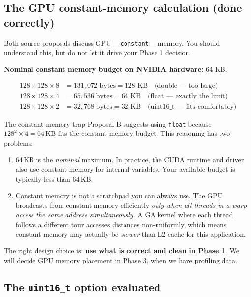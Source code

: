 \documentclass[11pt]{article}
\begin{document}
\subsection{The GPU constant-memory calculation (done correctly)}

Both source proposals discuss GPU \texttt{\_\_constant\_\_} memory. You should understand this, but do not let it drive your Phase 1 decision.

\textbf{Nominal constant memory budget on NVIDIA hardware:} 64 KB.

\begin{align*}
128 \times 128 \times 8 &= 131{,}072 \text{ bytes} = 128 \text{ KB} \quad \text{(double --- too large)} \\
128 \times 128 \times 4 &= 65{,}536 \text{ bytes} = 64 \text{ KB} \quad \text{(float --- exactly the limit)} \\
128 \times 128 \times 2 &= 32{,}768 \text{ bytes} = 32 \text{ KB} \quad \text{(uint16\_t --- fits comfortably)}
\end{align*}

\begin{warning}{The constant-memory trap}
Proposal B suggests using \texttt{float} because $128^2 \times 4 = 64$\,KB fits the constant memory budget. This reasoning has two problems:

\begin{enumerate}[label=\arabic*.]
  \item 64\,KB is the \emph{nominal} maximum. In practice, the CUDA runtime and driver also use constant memory for internal variables. Your available budget is typically less than 64\,KB.
  \item Constant memory is not a scratchpad you can always use. The GPU broadcasts from constant memory efficiently \emph{only when all threads in a warp access the same address simultaneously}. A GA kernel where each thread follows a different tour accesses distances non-uniformly, which means constant memory may actually be \emph{slower} than L2 cache for this application.
\end{enumerate}

The right design choice is: \textbf{use what is correct and clean in Phase 1}. We will decide GPU memory placement in Phase 3, when we have profiling data.
\end{warning}

\subsection{The \texttt{uint16\_t} option evaluated}
\end{document}
